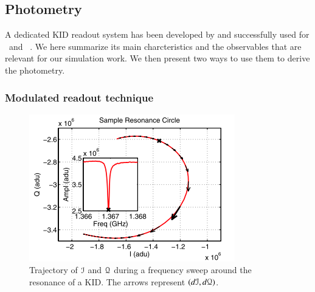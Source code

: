 \subsection{Photometry}
\label{sec:signal}

A dedicated KID readout system has been developed by \citet{2013A&A...551L..12C}
and successfully used for \nika\ and \ \citep{2010A&A...521A..29M,2016JLTP..184..816C}. We here summarize its main charcteristics and the observables
that are relevant for our simulation work. We then present two ways to use them
to derive the photometry.


\subsubsection{Modulated readout technique}

\begin{figure}
  \includegraphics[clip,angle=0,width=\columnwidth]{Figures/resonance-circle.png}
  \caption{Trajectory of $\mathcal{I}$ and $\mathcal{Q}$ during a frequency sweep around the
    resonance of a KID. The arrows represent $(d\mathcal{I},
    d\mathcal{Q})$. \citep{2013A&A...551L..12C}}
  \label{circle-iq}
\end{figure}

